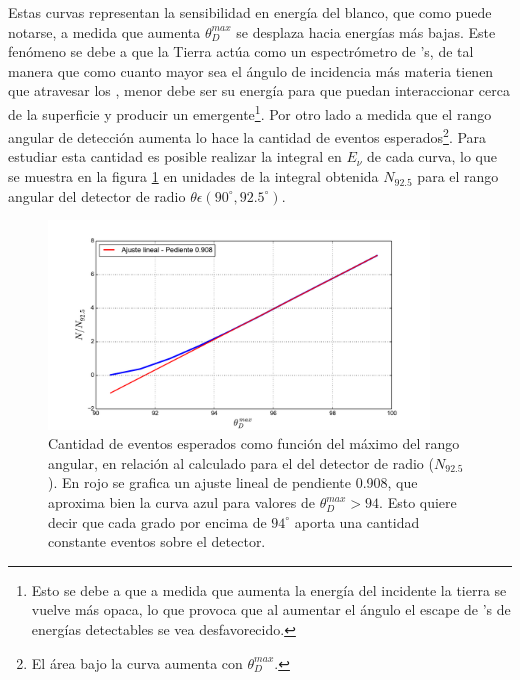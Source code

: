 	Estas curvas representan la sensibilidad en energ\'ia del blanco, que como puede notarse, a medida que aumenta $\theta_D^{max}$ se desplaza hacia energ\'ias m\'as bajas.
	Este fen\'omeno se debe a que la Tierra act\'ua como un espectr\'ometro de \tauon{}'s, de tal manera que como cuanto mayor sea el \'angulo de incidencia m\'as materia tienen que atravesar los \nutau{}, menor debe ser su energ\'ia para que puedan interaccionar cerca de la superficie y producir un \tauon{} emergente\footnote{Esto se debe a que a medida que aumenta la energ\'ia del \nutau{} incidente la tierra se vuelve m\'as opaca, lo que provoca que al aumentar el \'angulo el escape de \tauon{}'s de energ\'ias detectables se vea desfavorecido.}.
	Por otro lado a medida que el rango angular de detecci\'on aumenta lo hace la cantidad de eventos esperados\footnote{El \'area bajo la curva aumenta con $\theta_D^{max}$.}.
	Para estudiar esta cantidad es posible realizar la integral en $E_\nu$ de cada curva, lo que se muestra en la figura \ref{fig:gainThetas} en unidades de la integral obtenida $N_{92.5}$ para el rango angular del detector de radio $\theta\epsilon(90^\circ,92.5^\circ)$. 
	\begin{figure}[h!]
		\begin{center}
			\includegraphics[width=0.9\textwidth]{fig/resultadosRadio/eventGain_thetas}
			\caption{\label{fig:gainThetas} Cantidad de eventos esperados como funci\'on del m\'aximo del rango angular, en relaci\'on al calculado para el del detector de radio ($N_{92.5}$).
			En rojo se grafica un ajuste lineal de pendiente 0.908, que aproxima bien la curva azul para valores de $\theta_D^{max}>94$.
			Esto quiere decir que cada grado por encima de $94^\circ$ aporta una cantidad constante eventos sobre el detector.
			}
		\end{center}
	\end{figure}
